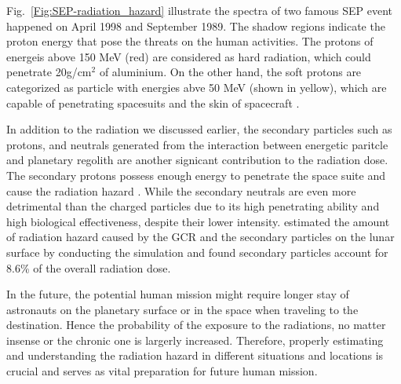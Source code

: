 Fig.~\ref{Fig:SEP-radiation_hazard} illustrate the spectra of two famous \ac{SEP} event happened on April 1998 and September 1989. The shadow regions indicate the proton energy that pose the threats on the human activities. The protons of energeis above 150 MeV (red) are considered as hard radiation, which could penetrate 20g/cm$^2$ of aluminium. On the other hand, the soft protons are categorized as particle with energies abve 50 MeV (shown in yellow), which are capable of penetrating spacesuits and the skin of spacecraft \citep{Reames2021LNP}. 

In addition to the radiation we discussed earlier, the secondary particles such as protons, and neutrals generated from the interaction between energetic paritcle and planetary regolith are another signicant contribution to the radiation dose. The secondary protons possess enough energy to penetrate the space suite and cause the radiation hazard \citep{Xu2022FrASS}. While the secondary neutrals are even more detrimental than the charged particles due to its high penetrating ability and high biological effectiveness, despite their lower intensity.
\citet{Spence2013} estimated the amount of radiation hazard caused by the \ac{GCR} and the secondary particles on the lunar surface by conducting the simulation and found secondary particles account for 8.6\% of the overall radiation dose.

In the future, the potential human mission might require longer stay of astronauts on the planetary surface or in the space when traveling to the destination. Hence the probability of the exposure to the radiations, no matter insense or the chronic one is largerly increased. Therefore, properly estimating and understanding the radiation hazard in different situations and locations is crucial and serves as vital preparation for future human mission.









